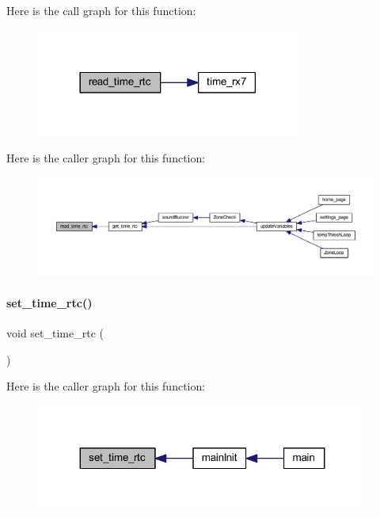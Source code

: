Here is the call graph for this function\+:
\nopagebreak
\begin{figure}[H]
\begin{center}
\leavevmode
\includegraphics[width=246pt]{a00014_add06d1f93d90576fa369c2401c1d4aed_cgraph}
\end{center}
\end{figure}
Here is the caller graph for this function\+:
\nopagebreak
\begin{figure}[H]
\begin{center}
\leavevmode
\includegraphics[width=350pt]{a00014_add06d1f93d90576fa369c2401c1d4aed_icgraph}
\end{center}
\end{figure}
\mbox{\label{a00014_af48611801cb8ae30f21f4263183355a4}} 
\paragraph{set\+\_\+time\+\_\+rtc()}
{\footnotesize\ttfamily void set\+\_\+time\+\_\+rtc (\begin{DoxyParamCaption}{ }\end{DoxyParamCaption})}

Here is the caller graph for this function\+:
\nopagebreak
\begin{figure}[H]
\begin{center}
\leavevmode
\includegraphics[width=311pt]{a00014_af48611801cb8ae30f21f4263183355a4_icgraph}
\end{center}
\end{figure}
\mbox{\label{a00014_a93b2ace39d0d582b18b136c908d8f092}} 
